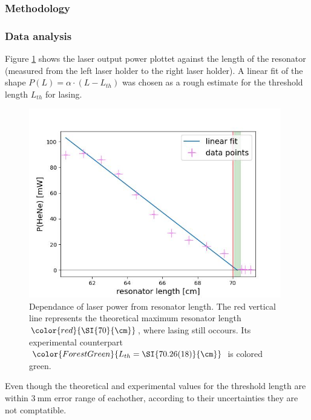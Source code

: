 \documentclass[../main.tex]{subfiles}
\begin{document}
    
\subsubsection*{Methodology}
\subsubsection*{Data analysis}

Figure \ref{fig:4-Laserleistung-Resonatorlaenge} shows the laser output power plottet against the length of the resonator (measured from the left laser holder to the right laser holder). A linear fit of the shape $P(L) = \alpha\cdot (L - L_{th})$ was chosen as a rough estimate for the threshold length $L_{th}$ for lasing.

\begin{figure}[H]
    \centering
    \includegraphics[width = 11cm]{Bilddateien/4-Laserleistung-Resonatorlaenge.jpg}
    \caption{Dependance of laser power from resonator length. The red vertical line represents the theoretical maximum resonator length $\color{red}{\SI{70}{\cm}}$, where lasing still occours. Its experimental counterpart $\color{ForestGreen}{L_{th} = \SI{70.26(18)}{\cm}}$  is colored green.}
    \label{fig:4-Laserleistung-Resonatorlaenge}
\end{figure}

\noindent Even though the theoretical and experimental values for the threshold length are within $\SI{3}{\mm}$ error range of eachother, according to their uncertainties they are not comptatible. 
\end{document}
